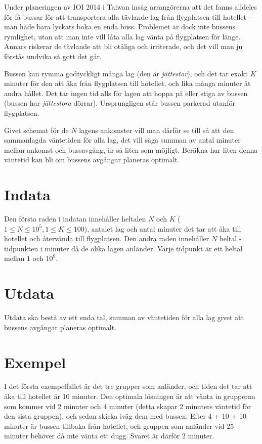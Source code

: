 
Under planeringen av IOI 2014 i Taiwan insåg arrangörerna att det fanns alldeles för få bussar för att transportera alla tävlande lag från flygplatsen till hotellet - man hade bara lyckats boka en enda buss. Problemet är dock inte bussens rymlighet, utan att man inte vill låta alla lag vänta på flygplatsen för länge. Annars riskerar de tävlande att bli otåliga och irriterade, och det vill man ju förstås undvika så gott det går.

Bussen kan rymma godtyckligt många lag (den är \emph{jättestor}), och det tar exakt $K$ minuter för den att åka från flygplatsen till hotellet, och lika många minuter åt andra hållet. Det tar ingen tid alls för lagen att hoppa på eller stiga av bussen (bussen har \emph{jättestora} dörrar). Ursprungligen står bussen parkerad utanför flygplatsen.

Givet schemat för de $N$ lagens ankomster vill man därför se till så att den sammanlagda väntetiden för alla lag, det vill säga summan av antal minuter mellan ankomst och bussavgång, är så liten som möjligt. Beräkna hur liten denna väntetid kan bli om bussens avgångar planeras optimalt.

\section*{Indata}
Den första raden i indatan innehåller heltalen $N$ och $K$ ($1 \leq N \leq 10^5, 1 \leq K \leq 100$), antalet lag och antal minuter det tar att åka till hotellet och återvända till flygplatsen.
Den andra raden innehåller $N$ heltal - tidpunkten i minuter då de olika lagen anländer. Varje tidpunkt är ett heltal mellan $1$ och $10^9$.

\section*{Utdata}
Utdata ska bestå av ett enda tal, summan av väntetiden för alla lag givet att bussens avgångar planeras optimalt.

\section*{Exempel}
I det första exempelfallet är det tre grupper som anländer, och tiden det tar att åka till hotellet är 10 minuter. Den optimala lösningen är att vänta in grupperna som kommer vid 2 minuter och 4 minuter (detta skapar 2 minuters väntetid för den sista gruppen), och sedan skicka iväg dem med bussen. Efter 4 + 10 + 10 minuter är bussen tillbaka från hotellet, och gruppen som anländer vid 25 minuter behöver då inte vänta ett dugg. Svaret är därför 2 minuter.


